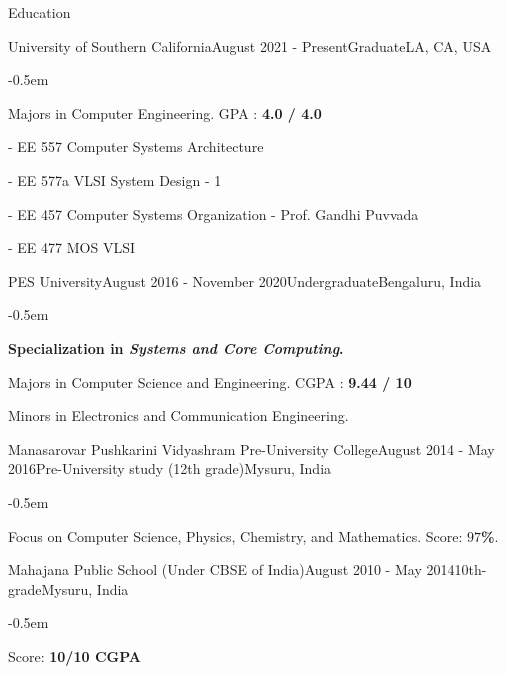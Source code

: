 \documentclass{CV} %
\begin{document}
\begin{rSection}{Education}


  \begin{rSubsection}{University of Southern California}{August 2021 - Present}{Graduate}{LA, CA, USA}
    \begin{list}{}{\footnotesize}\itemsep -0.5em \vspace{-0.5em}
      \item Majors in Computer Engineering. GPA : {\bf 4.0 / 4.0}
      \item - EE 557  Computer Systems Architecture
      \item - EE 577a VLSI System Design - 1
      \item - EE 457  Computer Systems Organization - Prof. Gandhi Puvvada
      \item - EE 477  MOS VLSI
    \end{list}
  \end{rSubsection}

  \begin{rSubsection}{PES University}{August 2016 - November 2020}{Undergraduate}{Bengaluru, India}
    \begin{list}{}{\footnotesize}\itemsep -0.5em \vspace{-0.5em}
      \item {\bf Specialization in \textit{Systems and Core Computing}.}
      \item Majors in Computer Science and Engineering. CGPA : {\bf 9.44 / 10}
      \item Minors in Electronics and Communication Engineering.
    \end{list}
  \end{rSubsection}
  
  \begin{rSubsection}{Manasarovar Pushkarini Vidyashram Pre-University College}{August 2014 - May 2016}{Pre-University study \tiny{(12th grade)}}{Mysuru, India}
    \begin{list}{}{\footnotesize}\itemsep -0.5em \vspace{-0.5em}
      \item Focus on Computer Science, Physics, Chemistry, and Mathematics. Score: {\bf $97$\%}.
    \end{list}
  \end{rSubsection}

  \begin{rSubsection}{Mahajana Public School \scriptsize{(Under CBSE of India)}}{August 2010 - May 2014}{10th-grade}{Mysuru, India}
    \begin{list}{}{\footnotesize}\itemsep -0.5em \vspace{-0.5em}
      \item Score: {\bf 10/10 CGPA}
    \end{list}
  \end{rSubsection}

\end{rSection}
\end{document}

